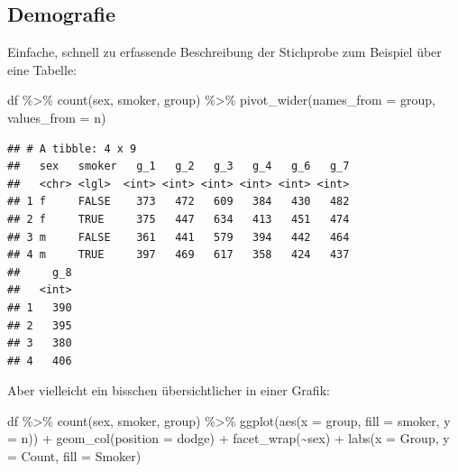 \documentclass[
]{book}
\newenvironment{Shaded}{\begin{snugshade}}{\end{snugshade}}
\newcommand{\AttributeTok}[1]{\textcolor[rgb]{0.77,0.63,0.00}{#1}}
\newcommand{\FunctionTok}[1]{\textcolor[rgb]{0.00,0.00,0.00}{#1}}
\newcommand{\NormalTok}[1]{#1}
\newcommand{\SpecialCharTok}[1]{\textcolor[rgb]{0.00,0.00,0.00}{#1}}
\newcommand{\StringTok}[1]{\textcolor[rgb]{0.31,0.60,0.02}{#1}}
\begin{document}
\hypertarget{demografie}{%
\subsection{Demografie}\label{demografie}}

Einfache, schnell zu erfassende Beschreibung der Stichprobe zum Beispiel über eine Tabelle:

\begin{Shaded}
\begin{Highlighting}[]
\NormalTok{df }\SpecialCharTok{\%\textgreater{}\%} 
  \FunctionTok{count}\NormalTok{(sex, smoker, group) }\SpecialCharTok{\%\textgreater{}\%} 
  \FunctionTok{pivot\_wider}\NormalTok{(}\AttributeTok{names\_from =}\NormalTok{ group,}
              \AttributeTok{values\_from =}\NormalTok{ n)}
\end{Highlighting}
\end{Shaded}

\begin{verbatim}
## # A tibble: 4 x 9
##   sex   smoker   g_1   g_2   g_3   g_4   g_6   g_7
##   <chr> <lgl>  <int> <int> <int> <int> <int> <int>
## 1 f     FALSE    373   472   609   384   430   482
## 2 f     TRUE     375   447   634   413   451   474
## 3 m     FALSE    361   441   579   394   442   464
## 4 m     TRUE     397   469   617   358   424   437
##     g_8
##   <int>
## 1   390
## 2   395
## 3   380
## 4   406
\end{verbatim}

Aber vielleicht ein bisschen übersichtlicher in einer Grafik:

\begin{Shaded}
\begin{Highlighting}[]
\NormalTok{df }\SpecialCharTok{\%\textgreater{}\%} 
  \FunctionTok{count}\NormalTok{(sex, smoker, group) }\SpecialCharTok{\%\textgreater{}\%} 
  \FunctionTok{ggplot}\NormalTok{(}\FunctionTok{aes}\NormalTok{(}\AttributeTok{x =}\NormalTok{ group, }\AttributeTok{fill =}\NormalTok{ smoker, }\AttributeTok{y =}\NormalTok{ n)) }\SpecialCharTok{+}
  \FunctionTok{geom\_col}\NormalTok{(}\AttributeTok{position =} \StringTok{\textquotesingle{}dodge\textquotesingle{}}\NormalTok{) }\SpecialCharTok{+}
  \FunctionTok{facet\_wrap}\NormalTok{(}\SpecialCharTok{\textasciitilde{}}\NormalTok{sex) }\SpecialCharTok{+}
  \FunctionTok{labs}\NormalTok{(}\AttributeTok{x =} \StringTok{\textquotesingle{}Group\textquotesingle{}}\NormalTok{,}
       \AttributeTok{y =} \StringTok{\textquotesingle{}Count\textquotesingle{}}\NormalTok{,}
       \AttributeTok{fill =} \StringTok{\textquotesingle{}Smoker\textquotesingle{}}\NormalTok{)}
\end{Highlighting}
\end{Shaded}
\end{document}
